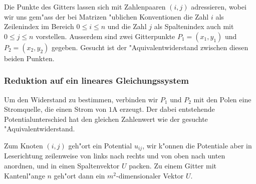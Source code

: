 Die Punkte des Gitters lassen sich mit
Zahlenpaaren $(i,j)$ adressieren, wobei wir uns gem"ass der bei Matrizen
"ublichen Konventionen die Zahl $i$ als Zeilenindex im Bereich $0\le i\le
n$ und die Zahl $j$ als Spaltenindex auch mit $0\le j\le n$ vorstellen.
Ausserdem sind zwei Gitterpunkte $P_1=(x_1,y_1)$ und $P_2=(x_2,y_2)$
gegeben. Gesucht ist der "Aquivalentwiderstand zwischen diesen beiden
Punkten.

\subsubsection{Reduktion auf ein lineares Gleichungssystem}
Um den Widerstand zu bestimmen, verbinden wir $P_1$ und $P_2$ mit den
Polen eine Stromquelle, die einen Strom von $1$A erzeugt. Der dabei
entstehende Potentialunterschied hat den gleichen Zahlenwert wie der
gesuchte "Aquivalentwiderstand. 

Zum Knoten $(i,j)$ geh"ort ein Potential $u_{ij}$, wir
k"onnen die Potentiale aber in Leserichtung zeilenweise von
links nach rechts und von oben nach unten anordnen, und in
einen Spaltenvektor $U$ packen.
Zu einem Gitter mit Kantenl"ange $n$ geh"ort dann
ein $m^2$-dimensionaler Vektor $U$.

